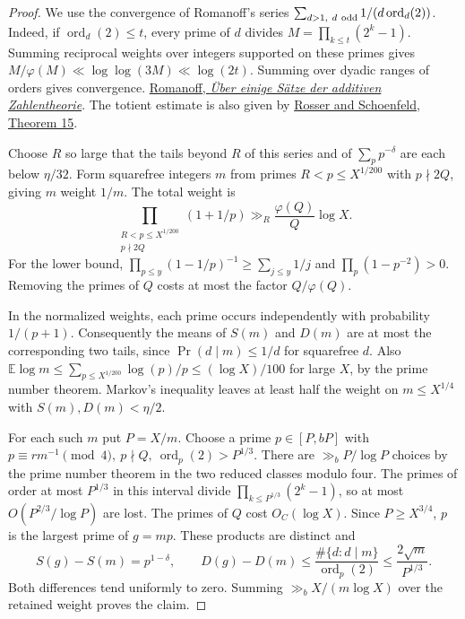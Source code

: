 \documentclass[11pt]{article}
\newcommand{\ord}{\operatorname{ord}}
\begin{document}
\begin{proof}
We use the convergence of Romanoff's series
\(\sum_{d>1,\ d\ {\rm odd}}1/(d\ord_d(2))\).
Indeed, if \(\ord_d(2)\le t\), every prime of \(d\) divides
\(M=\prod_{k\le t}(2^k-1)\). Summing reciprocal weights over integers
supported on these primes gives \(M/\varphi(M)\ll\log\log(3M)\ll\log(2t)\).
Summing over dyadic ranges of orders gives convergence.
\href{https://doi.org/10.1007/BF01449161}{Romanoff, \emph{Über einige Sätze der additiven Zahlentheorie}}.
The totient estimate is also given by
\href{https://doi.org/10.1215/ijm/1255631807}{Rosser and Schoenfeld, Theorem 15}.

Choose \(R\) so large that the tails beyond \(R\) of this series
and of \(\sum_p p^{-\delta}\) are each below \(\eta/32\).
Form squarefree integers \(m\) from primes
\(R<p\le X^{1/200}\) with \(p\nmid 2Q\), giving \(m\) weight \(1/m\).
The total weight is
\[
 \prod_{\substack{R<p\le X^{1/200}\\p\nmid 2Q}}(1+1/p)
 \gg_R \frac{\varphi(Q)}Q\log X .
\]
For the lower bound, \(\prod_{p\le y}(1-1/p)^{-1}\ge\sum_{j\le y}1/j\)
and \(\prod_p(1-p^{-2})>0\). Removing the primes of \(Q\) costs at
most the factor \(Q/\varphi(Q)\).

In the normalized weights, each prime occurs independently with
probability \(1/(p+1)\). Consequently the means of \(S(m)\) and
\(D(m)\) are at most the corresponding two tails, since
\(\Pr(d\mid m)\le1/d\) for squarefree \(d\). Also
\(\mathbb E\log m\le\sum_{p\le X^{1/200}}\log(p)/p
\le(\log X)/100\) for large \(X\), by the prime number theorem.
Markov's inequality leaves at least half the weight on
\(m\le X^{1/4}\) with \(S(m),D(m)<\eta/2\).

For each such \(m\) put \(P=X/m\). Choose a prime \(p\in[P,bP]\)
with \(p\equiv r m^{-1}\pmod4,\ p\nmid Q,\ \ord_p(2)>P^{1/3}\).
There are \(\gg_b P/\log P\) choices by the prime number theorem
in the two reduced classes modulo four. The primes of order at most
\(P^{1/3}\) in this interval divide \(\prod_{k\le P^{1/3}}(2^k-1)\),
so at most \(O(P^{2/3}/\log P)\) are lost. The primes of \(Q\)
cost \(O_C(\log X)\). Since \(P\ge X^{3/4}\), \(p\) is the largest
prime of \(g=mp\). These products are distinct and
\[
 S(g)-S(m)=p^{1-\delta},\qquad
 D(g)-D(m)\le \frac{\#\{d:d\mid m\}}{\ord_p(2)}
             \le \frac{2\sqrt m}{P^{1/3}} .
\]
Both differences tend uniformly to zero. Summing
\(\gg_b X/(m\log X)\) over the retained weight proves the claim.
\end{proof}
\end{document}
